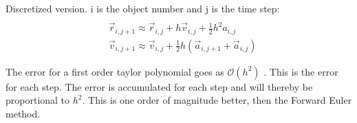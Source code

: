 Discretized version. i is the object number and j is the time step:
\begin{align*}
	\\
	&\vec{r}_{i,j+1} \approx \vec{r}_{i,j} + h \vec{v}_{i,j} + \frac{1}{2} h^2 a_{i,j}
	\\
	&\vec{v}_{i,j+1} \approx \vec{v}_{i,j} +\frac{1}{2} h(\vec{a}_{i,j+1} + \vec{a}_{i,j})
\end{align*}


The error for a first order taylor polynomial goes as $\mathcal{O}(h^2)$ \cite{compphys}. This is the error for each step. The error is accumulated for each step and will thereby be proportional to $h^2$. This is one order of magnitude better, then the Forward Euler method. 

















